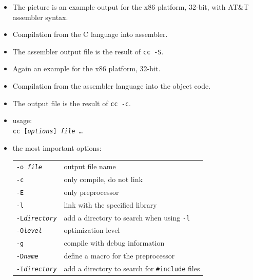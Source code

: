 \begin{itemize}
\item The picture is an example output for the x86 platform, 32-bit,
with AT\&T assembler syntax.
\item Compilation from the C language into assembler.
\item The assembler output file is the result of \texttt{cc -S}.
\end{itemize}


\begin{slide}
\begin{center}

\end{center}
\end{slide}

\begin{itemize}
\item Again an example for the x86 platform, 32-bit.
\item Compilation from the assembler language into the object code.
\item The output file is the result of \texttt{cc -c}.
\end{itemize}


\begin{slide}
\renewcommand{\arraystretch}{1.1}
\begin{itemize}
\item usage:\\
\texttt{cc [\emph{options}] \emph{file} \dots}
\item the most important options:\\
\begin{tabular}{ll}
\texttt{-o \emph{file}} & output file name\\
\texttt{-c} & only compile, do not link\\
\texttt{-E} & only preprocessor\\
\texttt{-l} & link with the specified library\\
\texttt{-L\emph{directory}} & add a directory to search when using \texttt{-l}\\
\texttt{-O\emph{level}} & optimization level\\
\texttt{-g} & compile with debug information\\
\texttt{-D\emph{name}} & define a macro for the preprocessor\\
\texttt{-I\emph{directory}} & add a directory to search for \texttt{\#include} files
\end{tabular}
\end{itemize}
\end{slide}

